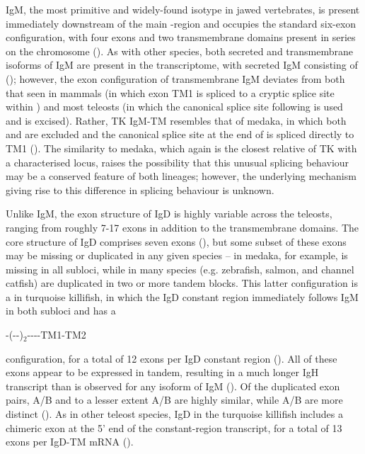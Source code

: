 	IgM, the most primitive and widely-found isotype in jawed vertebrates, is present immediately downstream of the main \jh-region and occupies the standard six-exon configuration, with four \cm{} exons and two transmembrane domains present in series on the chromosome (). As with other species, both secreted and transmembrane isoforms of IgM are present in the transcriptome, with secreted IgM consisting of  (); however, the exon configuration of transmembrane IgM deviates from both that seen in mammals (in which exon TM1 is spliced to a cryptic splice site within ) and most teleosts (in which the canonical splice site following  is used and  is excised). Rather, TK IgM-TM resembles that of medaka, in which both  and  are excluded and the canonical splice site at the end of  is spliced directly to TM1 (). The similarity to medaka, which again is the closest relative of TK with a characterised locus, raises the possibility that this unusual splicing behaviour may be a conserved feature of both lineages; however, the underlying mechanism giving rise to this difference in splicing behaviour is unknown.
	
		Unlike IgM, the exon structure of IgD is highly variable across the teleosts, ranging from roughly 7-17 \cd{} exons in addition to the transmembrane domains. The core structure of IgD comprises seven \cd{} exons (), but some subset of these exons may be missing or duplicated in any given species -- in medaka, for example,  is missing in all subloci, while in many species (e.g. zebrafish, salmon, and channel catfish)  are duplicated in two or more tandem blocks. This latter configuration is a in turquoise killifish, in which the IgD constant region immediately follows IgM in both subloci and has a 

-(--)$_2$----TM1-TM2 

	\noindent configuration, for a total of 12 exons per IgD constant region (). All of these exons appear to be expressed in tandem, resulting in a much longer IgH transcript than is observed for any isoform of IgM (). Of the duplicated exon pairs, A/B and to a lesser extent A/B are highly similar, while A/B are more distinct (). As in other teleost species, IgD in the turquoise killifish includes a chimeric  exon at the 5' end of the constant-region transcript, for a total of 13 exons per IgD-TM mRNA ().

